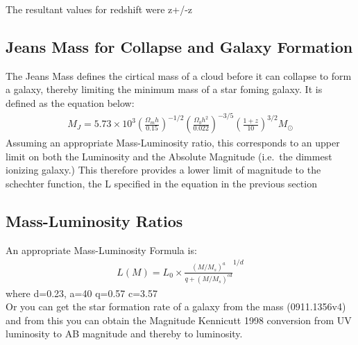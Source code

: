 		The resultant values for redshift were z+/-z

	\subsection{Jeans Mass for Collapse and Galaxy Formation} %
	\label{sub:jeans_mass_for_collapse_and_galaxy_formation}
		The Jeans Mass defines the cirtical mass of a cloud before it can collapse to form a galaxy, thereby limiting the minimum mass of a star foming galaxy. It is defined as the equation below:
		\begin{align}
		M_J = 5.73\times 10^3{\left(\frac{\Omega_m h}{0.15} \right)}^{-1/2} {\left( \frac{\Omega_b h^2}{0.022}\right)}^{-3/5} {\left( \frac{1+z}{10} \right)}^{3/2} M_\odot
		\end{align}
		Assuming an appropriate Mass-Luminosity ratio, this corresponds to an upper limit on both the Luminosity and the Absolute Magnitude (i.e.\ the dimmest ionizing galaxy.) This therefore provides a lower limit of magnitude to the schechter function, the L specified in the equation in the previous section

		\subsection{Mass-Luminosity Ratios}

		An appropriate Mass-Luminosity Formula is:
		\begin{align}
		L(M) = L_0 \times \frac {{(M/M_s)}^a} {q+{(M/M_s)}^{cd}}^{1/d}
		\end{align}
		where d=0.23, a=40 q=0.57 c=3.57\\
		\newline
		Or you can get the star formation rate of a galaxy from the mass (0911.1356v4) and from this you can obtain the Magnitude Kennicutt 1998 conversion from UV luminosity to AB magnitude and thereby to luminosity.


